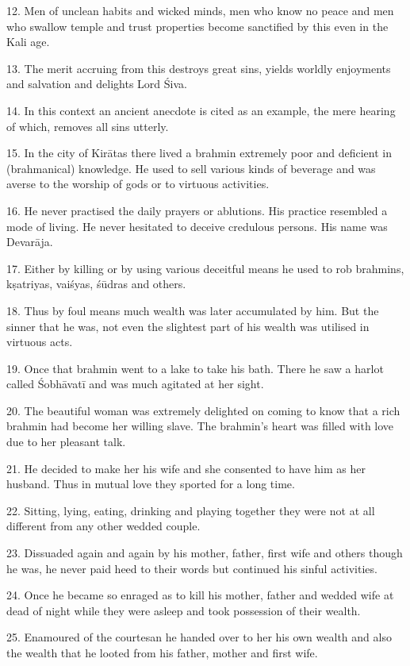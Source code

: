 12. Men of unclean habits and wicked minds, men who know no peace and men who
swallow temple and trust properties become sanctified by this 
even in the Kali age.

13. The merit accruing from this  destroys great sins, yields worldly
enjoyments and salvation and delights Lord Śiva.

14. In this context an ancient anecdote is cited as an example, the mere hearing
of which, removes all sins utterly.

15. In the city of Kirātas there lived a brahmin extremely poor and deficient in
(brahmanical) knowledge. He used to sell various kinds of beverage and was
averse to the worship of gods or to virtuous activities.

16. He never practised the daily  prayers or ablutions. His practice
resembled a  mode of living. He never hesitated to deceive
credulous persons. His name was Devarāja.

17. Either by killing or by using various deceitful means he used to rob
brahmins, kṣatriyas, vaiśyas, śūdras and others.

18. Thus by foul means much wealth was later accumulated by him. But the sinner
that he was, not even the slightest part of his wealth was utilised in virtuous
acts.

19. Once that brahmin went to a lake to take his bath. There he saw a harlot
called Śobhāvatī and was much agitated at her sight.

20. The beautiful woman was extremely delighted on coming to know that a rich
brahmin had become her willing slave. The brahmin’s heart was filled with love
due to her pleasant talk.

21. He decided to make her his wife and she consented to have him as her
husband. Thus in mutual love they sported for a long time.

22. Sitting, lying, eating, drinking and playing together they were not at all
different from any other wedded couple.

23. Dissuaded again and again by his mother, father, first wife and others
though he was, he never paid heed to their words but continued his sinful
activities.

24. Once he became so enraged as to kill his mother, father and wedded wife at
dead of night while they were asleep and took possession of their wealth.

25. Enamoured of the courtesan he handed over to her his own wealth and also
the wealth that he looted from his father, mother and first wife.

